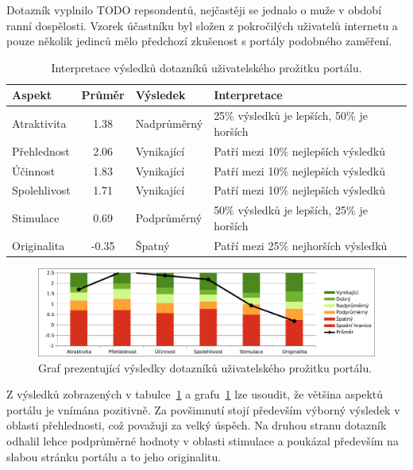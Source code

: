 Dotazník vyplnilo TODO repsondentů, nejčastěji se jednalo o muže v období ranní dospělosti. Vzorek účastníku byl složen z pokročilých uživatelů internetu a pouze několik jedinců mělo předchozí zkušenost s portály podobného zaměření. 

\begin{table}[h!]
\centering
\begin{tabular}{ |l|c|l|l| } 
\hline
Aspekt       & Průměr & Výsledek    & Interpretace                              \\
\hline
Atraktivita  & 1.38   & Nadprůměrný & 25\% výsledků je lepších, 50\% je horších \\
Přehlednost  & 2.06   & Vynikající  & Patří mezi 10\% nejlepších výsledků       \\
Účinnost     & 1.83   & Vynikající  & Patří mezi 10\% nejlepších výsledků       \\
Spolehlivost & 1.71   & Vynikající  & Patří mezi 10\% nejlepších výsledků       \\
Stimulace    & 0.69   & Podprůměrný & 50\% výsledků je lepších, 25\% je horších \\
Originalita  & -0.35  & Špatný      & Patří mezi 25\% nejhorších výsledků       \\  
\hline
\end{tabular}
\caption{Interpretace výsledků dotazníků uživatelského prožitku portálu.}
\label{table:ueq}
\end{table}

\begin{figure}[H]
	\centering
	\includegraphics[width=\textwidth]{obrazky-figures/ueq.pdf}
	\caption{Graf prezentující výsledky dotazníků uživatelského prožitku portálu.}
    \label{img:ueq}
\end{figure}

Z výsledků zobrazených v tabulce~\ref{table:ueq} a grafu~\ref{img:ueq} lze usoudit, že většina aspektů portálu je vnímána pozitivně. Za povšimnutí stojí především výborný výsledek v oblasti přehlednosti, což považuji za velký úspěch. Na druhou stranu dotazník odhalil lehce podprůměrné hodnoty v oblasti stimulace a poukázal především na slabou stránku portálu a to jeho originalitu.

